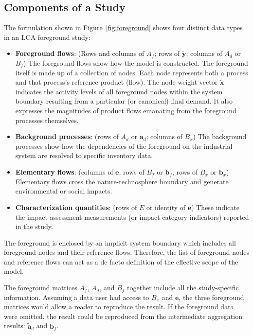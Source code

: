 \subsection{Components of a Study}

The formulation shown in Figure~\ref{fig:foreground} shows four distinct data types in an LCA foreground study: 

\begin{itemize}
\item \textbf{Foreground flows}: (Rows and columns of $A_f$; rows of $\tilde{\mathbf{y}}$; columns of $A_d$ or  $B_f$) The foreground flows show how the model is constructed.  The foreground itself is made up of a collection of nodes.  Each node represents both a process and that process's reference product (flow).  The node weight vector $\tilde{\mathbf{x}}$ indicates the activity levels of all foreground nodes within the system boundary resulting from a particular (or canonical) final demand.  It also expresses the magnitudes of product flows emanating from the foreground processes themselves.  
    
\item \textbf{Background processes}: (rows of $A_d$ or $\tilde{\mathbf{a}}_d$; columns of $B_x$) The background processes show how the dependencies of the foreground on the industrial system are resolved to specific inventory data.
  
 \item \textbf{Elementary flows}: (columns of $\mathbf{e}$, rows of $B_f$ or $\tilde{\mathbf{b}}_f$; rows of $B_x$ or $\tilde{\mathbf{b}}_x$)  Elementary flows cross the nature-technosphere boundary and generate environmental or social impacts.

 \item \textbf{Characterization quantities}: (rows of $E$ or identity of $\mathbf{e}$)  These indicate the impact assessment measurements (or impact category indicators) reported in the study.
\end{itemize}

The foreground is enclosed by an implicit system boundary which includes all foreground nodes and their reference flows.  Therefore, the list of foreground nodes and reference flows can act as a de facto definition of the effective scope of the model.  %

The foreground matrices $A_f$, $A_d$, and $B_f$ together include all the study-specific information.  Assuming a data user had access to $B_x$ and $\mathbf{e}$, the three foreground matrices would allow a reader to reproduce the result.  If the foreground data were omitted, the result could be reproduced from the intermediate aggregation results: $\tilde{\mathbf{a}}_d$ and $\tilde{\mathbf{b}}_f$.

